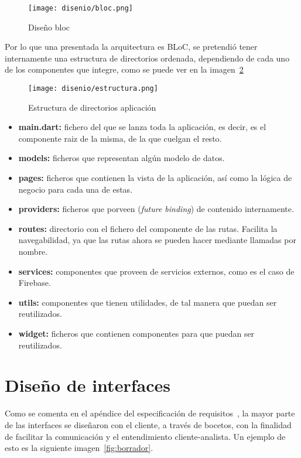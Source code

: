 \begin{figure}[H]
	\centering
	\texttt{[image: disenio/bloc.png]}
	\caption{Diseño bloc}\label{fig:bloc}
\end{figure}

Por lo que una presentada la arquitectura es BLoC, se pretendió tener internamente una estructura de directorios ordenada, dependiendo de cada uno de los componentes que integre, como se puede ver en la imagen~\ref{fig:estructura}

\begin{figure}[H]
	\centering
	\texttt{[image: disenio/estructura.png]}
	\caption{Estructura de directorios aplicación}\label{fig:estructura}
\end{figure}

\begin{itemize}
	\item \textbf{main.dart:} fichero del que se lanza toda la aplicación, es decir, es el componente raiz de la misma, de la que cuelgan el resto.
	
	\item \textbf{models:} ficheros que representan algún modelo de datos. 
	
	\item \textbf{pages:} ficheros que contienen la vista de la aplicación, así como la lógica de negocio para cada una de estas. 
	
	\item \textbf{providers:} ficheros que porveen (\emph{future binding}) de contenido internamente.
	
	\item \textbf{routes:} directorio con el fichero del componente de las rutas. Facilita la navegabilidad, ya que las rutas ahora se pueden hacer mediante llamadas por nombre.
	
	\item \textbf{services:} componentes que proveen de servicios externos, como es el caso de Firebase.
	
	\item \textbf{utils:} componentes que tienen utilidades, de tal manera que puedan ser reutilizados.
	
	\item \textbf{widget:} ficheros que contienen componentes para que puedan ser reutilizados.
	
\end{itemize}

\section{Diseño de interfaces}\label{nterfaces }
Como se comenta en el apéndice del especificación de requisitos~\pageref{requisitos}, la mayor parte de las interfaces se diseñaron con el cliente, a través de bocetos, con la finalidad de facilitar la comunicación y el entendimiento cliente-analista. Un ejemplo de esto es la siguiente imagen~\ref{fig:borrador}.


